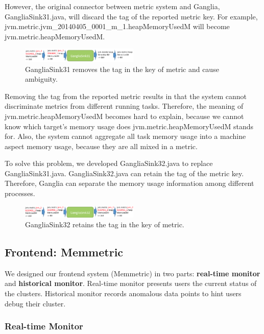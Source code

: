However, the original connector between metric system and Ganglia, GangliaSink31.java, will discard the tag of the reported metric key. For example, jvm.metric.jvm\_20140405\_0001\_m\_1.heapMemoryUsedM will become jvm.metric.heapMemoryUsedM. 

\begin{figure}[h!]
  \centering
    \includegraphics[width=0.5\textwidth]{image/ganglia31_flow.png}
  \caption{GangliaSink31 removes the tag in the key of metric and cause ambiguity.}
\end{figure}

Removing the tag from the reported metric results in that the system cannot discriminate metrics from different running tasks. Therefore, the meaning of jvm.metric.heapMemoryUsedM becomes hard to explain, because we cannot know which target's memory usage does  jvm.metric.heapMemoryUsedM stands for. Also, the system cannot aggregate all task memory usage into a machine aspect memory usage, because they are all mixed in a metric. 

To solve this problem, we developed GangliaSink32.java to replace GangliaSink31.java. GangliaSink32.java can retain the tag of the metric key. Therefore, Ganglia can separate the memory usage information among different processes. 

\begin{figure}[h!]
  \centering
  \includegraphics[width=0.5\textwidth]{image/ganglia32_flow.png}
  \caption{GangliaSink32 retains the tag in the key of metric.}
\end{figure}

\subsection{Frontend: Memmetric}
We designed our frontend system (Memmetric) in two parts: \textbf{real-time monitor} and \textbf{historical monitor}. Real-time monitor  presents users the current status of the clusters. Historical monitor records anomalous data points to hint users debug their cluster.

\subsubsection{Real-time Monitor}

